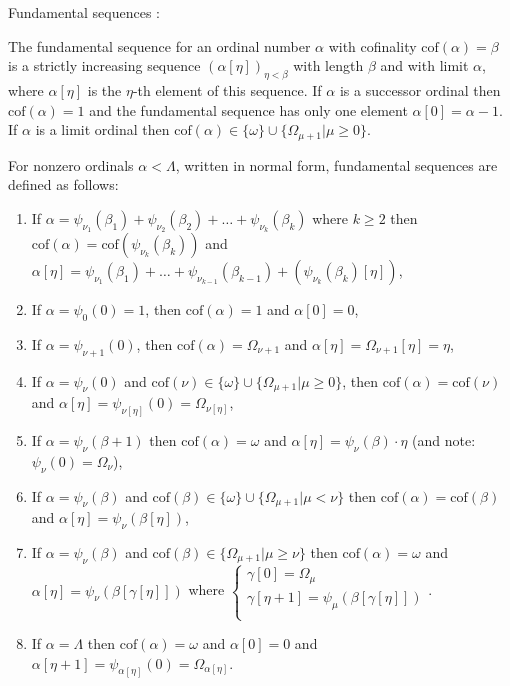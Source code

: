 \documentclass[10pt]{article}
\begin{document}
Fundamental sequences :

The fundamental sequence for an ordinal number \(\alpha\) with cofinality \(\text{cof}(\alpha)=\beta\) is a strictly increasing sequence \((\alpha[\eta])_{\eta<\beta}\) with length \(\beta\) and with limit \(\alpha\), where \(\alpha[\eta]\) is the \(\eta\)-th element of this sequence. If \(\alpha\) is a successor ordinal then \(\text{cof}(\alpha)=1\) and the fundamental sequence has only one element \(\alpha[0]=\alpha-1\). If \(\alpha\) is a limit ordinal then \(\text{cof}(\alpha)\in\{\omega\}\cup\{\Omega_{\mu+1}|\mu\geq 0\}\).

For nonzero ordinals \(\alpha<\Lambda\), written in normal form, fundamental sequences are defined as follows:

\begin{enumerate}
     \setlength{\itemsep}{1pt}
     \setlength{\parskip}{0pt}
     \setlength{\parsep}{0pt}
\item If \(\alpha=\psi_{\nu_1}(\beta_1)+\psi_{\nu_2}(\beta_2)+\ldots+\psi_{\nu_k}(\beta_k)\) where \(k\geq2\) then \(\text{cof}(\alpha)=\text{cof}(\psi_{\nu_k}(\beta_k))\) and \(\alpha[\eta]=\psi_{\nu_1}(\beta_1)+\ldots+\psi_{\nu_{k-1}}(\beta_{k-1})+(\psi_{\nu_k}(\beta_k)[\eta])\),
\item If \(\alpha=\psi_{0}(0)=1\), then \(\text{cof}(\alpha)=1\) and \(\alpha[0]=0\),
\item If \(\alpha=\psi_{\nu+1}(0)\), then \(\text{cof}(\alpha)=\Omega_{\nu+1}\) and \(\alpha[\eta]=\Omega_{\nu+1}[\eta]=\eta\),
\item If \(\alpha=\psi_{\nu}(0)\) and \(\text{cof}(\nu)\in\{\omega\}\cup\{\Omega_{\mu+1}|\mu\geq 0\}\), then \(\text{cof}(\alpha)=\text{cof}(\nu)\) and \(\alpha[\eta]=\psi_{\nu[\eta]}(0)=\Omega_{\nu[\eta]}\),
\item If \(\alpha=\psi_{\nu}(\beta+1)\) then \(\text{cof}(\alpha)=\omega\) and \(\alpha[\eta]=\psi_{\nu}(\beta)\cdot \eta\) (and note: \(\psi_\nu(0)=\Omega_\nu\)),
\item If \(\alpha=\psi_{\nu}(\beta)\) and \(\text{cof}(\beta)\in\{\omega\}\cup\{\Omega_{\mu+1}|\mu<\nu\}\) then \(\text{cof}(\alpha)=\text{cof}(\beta)\) and \(\alpha[\eta]=\psi_{\nu}(\beta[\eta])\),
\item If \(\alpha=\psi_{\nu}(\beta)\) and \(\text{cof}(\beta)\in\{\Omega_{\mu+1}|\mu\geq\nu\}\) then \(\text{cof}(\alpha)=\omega\) and \(\alpha[\eta]=\psi_{\nu}(\beta[\gamma[\eta]])\) where \(\left\{\begin{array}{lcr} \gamma[0]=\Omega_\mu \\ \gamma[\eta+1]=\psi_\mu(\beta[\gamma[\eta]])\\ \end{array}\right.\).
\item If \(\alpha=\Lambda\) then \(\text{cof}(\alpha)=\omega\) and \(\alpha[0]=0\) and \(\alpha[\eta+1]=\psi_{\alpha[\eta]}(0)=\Omega_{\alpha[\eta]}\).
\end{enumerate}
\end{document}
